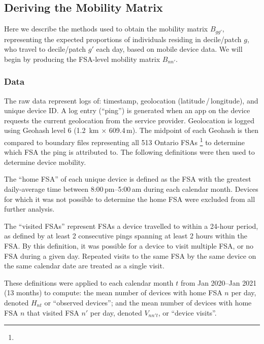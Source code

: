 \subsection{Deriving the Mobility Matrix}\label{app.mob}
Here we describe the methods used to obtain the mobility matrix $B_{gg'}$,
representing the expected proportions of individuals residing in decile/patch $g$,
who travel to decile/patch $g'$ each day,
based on mobile device data.
We will begin by producing the FSA-level mobility matrix $B_{nn'}$.
\subsubsection{Data}\label{app.mob.data}
The raw data represent logs of: timestamp, geolocation (latitude\,/\,longitude), and unique device ID.
A log entry (``ping'') is generated when an app on the device
requests the current geolocation from the service provider.
Geolocation is logged using Geohash level 6 (1.2 \,km $\times$ 609.4\,m).
The midpoint of each Geohash is then compared to boundary files representing all 513 Ontario FSAs%
\footnote{}
to determine which FSA the ping is attributed to.
The following definitions were then used to determine device mobility.
\par
The ``home FSA'' of each unique device is defined as
the FSA with the greatest daily-average time between 8:00\,pm--5:00\,am during each calendar month.
Devices for which it was not possible to determine the home FSA were excluded from all further analysis.
\par
The ``visited FSAs'' represent FSAs a device travelled to within a 24-hour period,
as defined by at least 2 consecutive pings spanning at least 2 hours within the FSA.
By this definition, it was possible for a device to visit multiple FSA, or no FSA during a given day.
Repeated visits to the same FSA by the same device on the same calendar date are treated as a single visit.
\par
These definitions were applied to each calendar month $t$ from Jan 2020--Jan 2021 (13 months) to compute:
the mean number of devices with home FSA $n$ per day, denoted $H_{nt}$ or ``observed devices''; and
the mean number of devices with home FSA $n$ that visited FSA $n'$ per day, denoted $V_{nn't}$, or ``device visits''.
